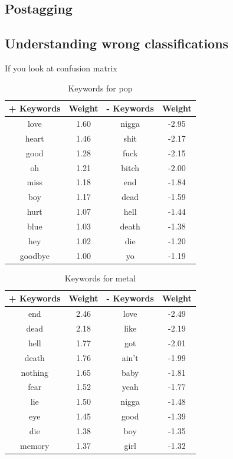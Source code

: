 \documentclass[a4paper,11pt]{article}
\begin{document}
\subsection{Postagging}

\subsection{Understanding wrong classifications}

If you look at confusion matrix

\begin{table}[h!]
\centering
\label{baseline}
\begin{tabular}{cccc}
\hline
+ Keywords & Weight & - Keywords & Weight \\
\hline
love & 1.60 & nigga & -2.95 \\
heart & 1.46 & shit & -2.17 \\
good & 1.28 & fuck & -2.15 \\
oh & 1.21 & bitch & -2.00 \\
miss & 1.18 & end & -1.84 \\
boy & 1.17 & dead & -1.59 \\
hurt & 1.07 & hell & -1.44 \\
blue & 1.03 & death & -1.38 \\
hey & 1.02 & die & -1.20 \\
goodbye & 1.00 & yo & -1.19 \\
\end{tabular}
\caption{Keywords for pop}
\end{table}

\begin{table}[h!]
\centering
\label{baseline}
\begin{tabular}{cccc}
\hline
+ Keywords & Weight & - Keywords & Weight \\
\hline
end & 2.46 & love & -2.49 \\
dead & 2.18 & like & -2.19 \\
hell & 1.77 & got & -2.01 \\
death & 1.76 & ain't & -1.99 \\
nothing & 1.65 & baby & -1.81 \\
fear & 1.52 & yeah & -1.77 \\
lie & 1.50 & nigga & -1.48 \\
eye & 1.45 & good & -1.39 \\
die & 1.38 & boy & -1.35 \\
memory & 1.37 & girl & -1.32 \\
\end{tabular}
\caption{Keywords for metal}
\end{table}
\end{document}
